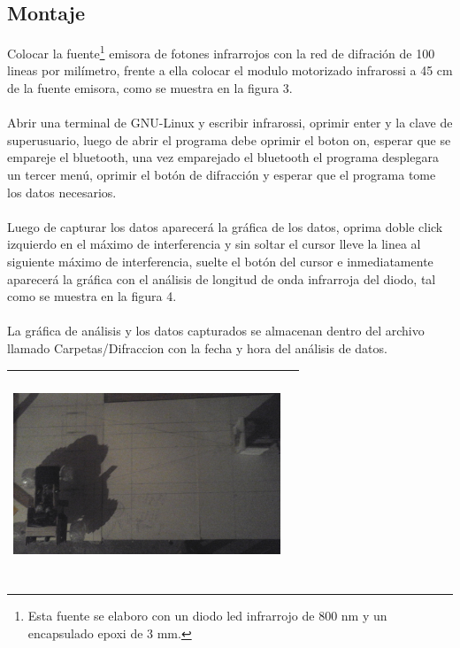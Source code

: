 \documentclass[12]{article}
\newenvironment{Figure}
{\par\medskip\noindent\minipage{\linewidth}}
{\endminipage\par\medskip}
\begin{document}
\begin{multicols}{2}
\subsection{Montaje}
Colocar la fuente\footnote{Esta fuente se elaboro con un diodo led infrarrojo de 800 nm y un encapsulado epoxi de 3 mm.} emisora de fotones infrarrojos con la red de difración de 100 lineas por milímetro, frente a ella colocar el modulo motorizado infrarossi a 45 cm de la fuente emisora, como se muestra en la figura 3. 
\\ \\
Abrir una terminal de GNU-Linux y escribir infrarossi, oprimir enter y la clave de superusuario, luego de abrir el programa debe oprimir el boton on, esperar que se empareje el bluetooth, una vez emparejado el bluetooth el programa desplegara un tercer menú, oprimir el botón de difracción y esperar que el programa tome los datos necesarios.
\\ \\
Luego de capturar los datos aparecerá la gráfica de los datos, oprima doble click izquierdo en el máximo de interferencia y sin soltar el cursor lleve la linea al siguiente máximo de interferencia,  suelte el botón del cursor e inmediatamente  aparecerá la gráfica con el análisis de longitud de onda infrarroja del diodo, tal como se muestra en la figura 4. \\\\
La gráfica de análisis y los datos capturados se almacenan dentro del archivo llamado Carpetas/Difraccion con la fecha y hora del análisis de datos.
\begin{Figure}	
\center
\begin{tabular}{|l|r|}
\hline
\includegraphics[width=8cm, height=6cm]{img/mon_difraccion.png} \\ \hline
\end{tabular}
\label{fig:g1}
\end{Figure}

\end{multicols}
\end{document}
